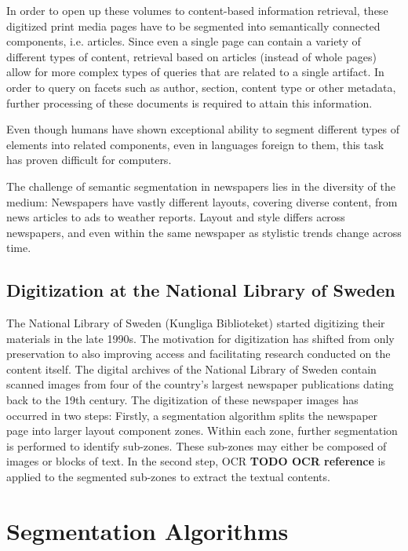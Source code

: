 \documentclass[english, bibtex]{kththesis}
\begin{document}
In order to open up these volumes to content-based information retrieval, these digitized print media pages have to be segmented into semantically connected components, i.e. articles. Since even a single page can contain a variety of different types of content, retrieval based on articles (instead of whole pages) allow for more complex types of queries that are related to a single artifact. In order to query on facets such as author, section, content type or other metadata, further processing of these documents is required to attain this information.  

Even though humans have shown exceptional ability to segment different types of elements into related components, even in languages foreign to them\cite{8270006}, this task has proven difficult for computers. 

The challenge of semantic segmentation in newspapers lies in the diversity of the medium: Newspapers have vastly different layouts, covering diverse content, from news articles to ads to weather reports. Layout and style differs across newspapers, and even within the same newspaper as stylistic trends change across time. 


\subsection{Digitization at the National Library of Sweden}

The National Library of Sweden (Kungliga Biblioteket) started digitizing their materials in the late 1990s. The motivation for digitization has shifted from only preservation to also improving access and facilitating research conducted on the content itself. \cite{Rekathati_2020} The digital archives of the National Library of Sweden contain scanned images from four of the country’s largest newspaper publications dating back to the 19th century. The digitization of these newspaper images has occurred in two steps: Firstly, a segmentation algorithm splits the newspaper page into larger layout component zones. Within each zone, further segmentation is performed to identify sub-zones. These sub-zones may either be composed of images or blocks of text. In the second step, OCR \textbf{TODO OCR reference} is applied to the segmented sub-zones to extract the textual contents. 

\section{Segmentation Algorithms}
\end{document}
